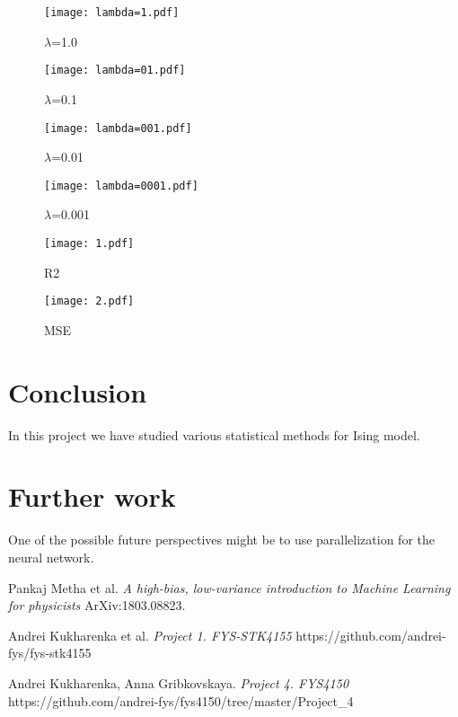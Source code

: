 \documentclass[10pt]{article}
\begin{document}
\begin{figure}
	\centerline{\texttt{[image: lambda=1.pdf]}}
	\caption{$\lambda$=1.0}
	\label{plt:lamda1}
\end{figure}

\begin{figure}
	\centerline{\texttt{[image: lambda=01.pdf]}}
	\caption{$\lambda$=0.1}
	\label{plt:lamda01}
\end{figure}

\begin{figure}
	\centerline{\texttt{[image: lambda=001.pdf]}}
	\caption{$\lambda$=0.01}
	\label{plt:lamda001}
\end{figure}

\begin{figure}
	\centerline{\texttt{[image: lambda=0001.pdf]}}
	\caption{$\lambda$=0.001}
	\label{plt:lamda0001}
\end{figure}

\begin{figure}
	\centerline{\texttt{[image: 1.pdf]}}
	\caption{R2}
	\label{plt:R2"}
\end{figure}

\begin{figure}
	\centerline{\texttt{[image: 2.pdf]}}
	\caption{MSE}
	\label{plt:MSE"}
\end{figure}


\section{Conclusion}
In this project we have studied various statistical methods for Ising model.

\section{Further work}
One of the possible future perspectives might be to use parallelization for the neural network.


\newpage
\begin{thebibliography}{9}
	Pankaj Metha et al. 
	\textit{A high-bias, low-variance introduction to Machine Learning for physicists}
	ArXiv:1803.08823.
	
	Andrei Kukharenka et al.
	\textit{Project 1. FYS-STK4155 }
	https://github.com/andrei-fys/fys-stk4155
	
	Andrei Kukharenka, Anna Gribkovskaya.
	\textit{Project 4. FYS4150 }
	https://github.com/andrei-fys/fys4150/tree/master/Project_4
	
\end{thebibliography}
\end{document}
